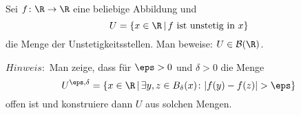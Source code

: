 \begin{prob}
Sei $f \colon \R \to \R$ eine beliebige Abbildung und
%
\[ U = \left\{ x \in \R \, | \, f \text{ ist unstetig in } x \right\} \]
%
die Menge der Unstetigkeitsstellen. Man beweise: $U \in \mathcal{B}( \R )$.

$Hinweis:$ Man zeige, dass f\"ur $\eps > 0$ und $\delta > 0$ die Menge
%
\[ U^{\eps , \delta } = \left\{ x \in \R \, | \, \exists y, z \in B_\delta(x) \colon | f(y) - f(z) | > \eps \right\} \]
%
offen ist und konstruiere dann $U$ aus solchen Mengen.
\end{prob}
